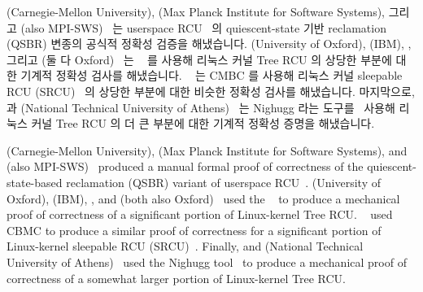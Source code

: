 \fi

 (Carnegie-Mellon University),  (Max
Planck Institute for Software Systems), 그리고 
(also MPI-SWS)~\cite{JosephTassarotti2015RCUproof}
는 userspace RCU~\cite{MathieuDesnoyers2009URCU,MathieuDesnoyers2012URCU} 의
quiescent-state 기반 reclamation (QSBR) 변종의 공식적 정확성 검증을 해냈습니다.
 (University of Oxford),  (IBM),
, 그리고 
(둘 다 Oxford)~\cite{LihaoLiang2016VerifyTreeRCU} 는
~\cite{EdmundClarke2004CBMC} 를 사용해
리눅스 커널 Tree RCU 의 상당한 부분에 대한 기계적 정확성 검사를 해냈습니다.
~\cite{LanceRoy2017CBMC-SRCU} 는 CMBC 를 사용해 리눅스 커널
sleepable RCU (SRCU)~\cite{PaulEMcKenney2006c} 의 상당한 부분에 대한 비슷한
정확성 검사를 해냈습니다.
마지막으로,  과 
(National Technical University of
Athens)~\cite{MichalisKokologiannakis2017NidhuggRCU,MichalisKokologiannakis2019RCUstatelessModelCheck}
는 Nighugg 라는 도구를~\cite{CarlLeonardsson2014Nidhugg} 사용해 리눅스 커널
Tree RCU 의 더 큰 부분에 대한 기계적 정확성 증명을 해냈습니다.

\iffalse

 (Carnegie-Mellon University),  (Max
Planck Institute for Software Systems), and 
(also MPI-SWS)~\cite{JosephTassarotti2015RCUproof}
produced a manual formal proof of correctness of the quiescent-state-based
reclamation (QSBR) variant of userspace
RCU~\cite{MathieuDesnoyers2009URCU,MathieuDesnoyers2012URCU}.
 (University of Oxford),  (IBM),
, and 
(both also Oxford)~\cite{LihaoLiang2016VerifyTreeRCU}
used the ~\cite{EdmundClarke2004CBMC}
to produce a mechanical proof of correctness of a significant portion
of Linux-kernel Tree RCU\@.
~\cite{LanceRoy2017CBMC-SRCU} used CBMC to produce a similar
proof of correctness for a significant portion of Linux-kernel
sleepable RCU (SRCU)~\cite{PaulEMcKenney2006c}.
Finally,  and 
(National Technical University of
Athens)~\cite{MichalisKokologiannakis2017NidhuggRCU,MichalisKokologiannakis2019RCUstatelessModelCheck}
used the Nighugg tool~\cite{CarlLeonardsson2014Nidhugg}
to produce a mechanical proof of correctness of a somewhat larger
portion of Linux-kernel Tree RCU\@.

